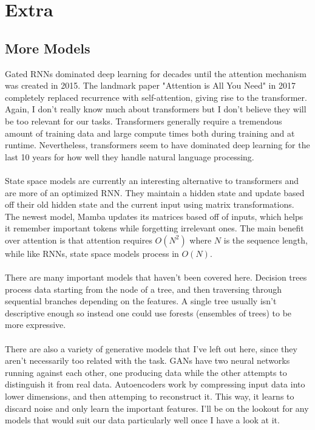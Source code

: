 \documentclass[11pt]{article}
\begin{document}
\section{Extra}
\subsection{More Models}
Gated RNNs dominated deep learning for decades until the attention mechanism was created in 2015. The landmark paper "Attention is All You Need" in 2017 completely replaced recurrence with self-attention, giving rise to the transformer.
Again, I don't really know much about transformers but I don't believe they will be too relevant for our tasks. Transformers generally require a tremendous amount of training data and large compute times both during training and at runtime.
Nevertheless, transformers seem to have dominated deep learning for the last 10 years for how well they handle natural language processing.
\\
\\
State space models are currently an interesting alternative to transformers and are more of an optimized RNN. They maintain a hidden state and update based off their old hidden state and the current input using matrix transformations. The newest model,
Mamba updates its matrices based off of inputs, which helps it remember important tokens while forgetting irrelevant ones. The main benefit over attention is that attention requires \( O(N^{2}) \) where \( N \) is the sequence length, while like RNNs,
state space models process in \( O(N) \). 
\\
\\
There are many important models that haven't been covered here. Decision trees process data starting from the node of a tree, and then traversing through sequential branches depending on the features. A single tree usually isn't descriptive enough so
instead one could use forests (ensembles of trees) to be more expressive. 
\\
\\
There are also a variety of generative models that I've left out here, since they aren't necessarily too related with the task. GANs have two neural networks running against each other, one producing data while the other attempts to distinguish 
it from real data. Autoencoders work by compressing input data into lower dimensions, and then attemping to reconstruct it. This way, it learns to discard noise and only learn the important features. I'll be on the lookout for any models that would
suit our data particularly well once I have a look at it. 
\\
\end{document}
